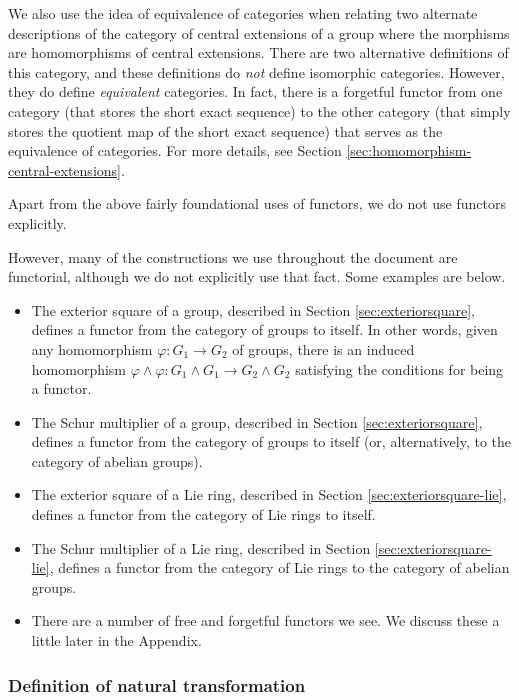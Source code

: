 We also use the idea of equivalence of categories when relating two
alternate descriptions of the category of central extensions of a
group where the morphisms are homomorphisms of central
extensions. There are two alternative definitions of this category,
and these definitions do {\em not} define isomorphic
categories. However, they do define {\em equivalent} categories. In
fact, there is a forgetful functor from one category (that stores the
short exact sequence) to the other category (that simply stores the
quotient map of the short exact sequence) that serves as the
equivalence of categories. For more details, see Section
\ref{sec:homomorphism-central-extensions}.

Apart from the above fairly foundational uses of functors, we do not
use functors explicitly. 

However, many of the constructions we use
throughout the document are functorial, although we do not explicitly
use that fact. Some examples are below.

\begin{itemize}
\item The exterior square of a group, described in Section
  \ref{sec:exteriorsquare}, defines a functor from the category of
  groups to itself. In other words, given any homomorphism
  $\varphi:G_1 \to G_2$ of groups, there is an induced homomorphism
  $\varphi \wedge \varphi: G_1 \wedge G_1 \to G_2 \wedge G_2$
  satisfying the conditions for being a functor.
\item The Schur multiplier of a group, described in Section
  \ref{sec:exteriorsquare}, defines a functor from the category of
  groups to itself (or, alternatively, to the category of abelian
  groups).
\item The exterior square of a Lie ring, described in Section
  \ref{sec:exteriorsquare-lie}, defines a functor from the category
  of Lie rings to itself.
\item The Schur multiplier of a Lie ring, described in Section
  \ref{sec:exteriorsquare-lie}, defines a functor from the category of
  Lie rings to the category of abelian groups.
\item There are a number of free and forgetful functors we see. We
  discuss these a little later in the Appendix.
\end{itemize}

\subsubsection{Definition of natural transformation}

